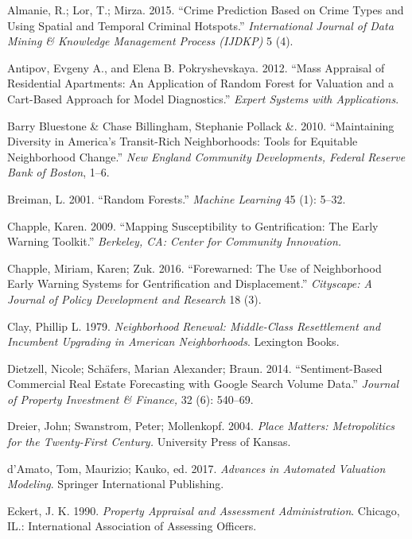 \documentclass[]{article}
\begin{document}
\hypertarget{refs}{}
\hypertarget{ref-Almanie2015}{}
Almanie, R.; Lor, T.; Mirza. 2015. ``Crime Prediction Based on Crime
Types and Using Spatial and Temporal Criminal Hotspots.''
\emph{International Journal of Data Mining \& Knowledge Management
Process (IJDKP)} 5 (4).

\hypertarget{ref-antipov12}{}
Antipov, Evgeny A., and Elena B. Pokryshevskaya. 2012. ``Mass Appraisal
of Residential Apartments: An Application of Random Forest for Valuation
and a Cart-Based Approach for Model Diagnostics.'' \emph{Expert Systems
with Applications}.

\hypertarget{ref-Pollack2010}{}
Barry Bluestone \& Chase Billingham, Stephanie Pollack \&. 2010.
``Maintaining Diversity in America's Transit-Rich Neighborhoods: Tools
for Equitable Neighborhood Change.'' \emph{New England Community
Developments, Federal Reserve Bank of Boston}, 1--6.

\hypertarget{ref-Breiman2001}{}
Breiman, L. 2001. ``Random Forests.'' \emph{Machine Learning} 45 (1):
5--32.

\hypertarget{ref-Chapple2009}{}
Chapple, Karen. 2009. ``Mapping Susceptibility to Gentrification: The
Early Warning Toolkit.'' \emph{Berkeley, CA: Center for Community
Innovation.}

\hypertarget{ref-Chapple2016}{}
Chapple, Miriam, Karen; Zuk. 2016. ``Forewarned: The Use of Neighborhood
Early Warning Systems for Gentrification and Displacement.''
\emph{Cityscape: A Journal of Policy Development and Research} 18 (3).

\hypertarget{ref-Clay1979}{}
Clay, Phillip L. 1979. \emph{Neighborhood Renewal: Middle-Class
Resettlement and Incumbent Upgrading in American Neighborhoods}.
Lexington Books.

\hypertarget{ref-Dietzell2014}{}
Dietzell, Nicole; Schäfers, Marian Alexander; Braun. 2014.
``Sentiment-Based Commercial Real Estate Forecasting with Google Search
Volume Data.'' \emph{Journal of Property Investment \& Finance,} 32 (6):
540--69.

\hypertarget{ref-Dreier2004}{}
Dreier, John; Swanstrom, Peter; Mollenkopf. 2004. \emph{Place Matters:
Metropolitics for the Twenty-First Century.} University Press of Kansas.

\hypertarget{ref-Springer2017}{}
d'Amato, Tom, Maurizio; Kauko, ed. 2017. \emph{Advances in Automated
Valuation Modeling}. Springer International Publishing.

\hypertarget{ref-Eckert1990}{}
Eckert, J. K. 1990. \emph{Property Appraisal and Assessment
Administration}. Chicago, IL.: International Association of Assessing
Officers.
\end{document}
